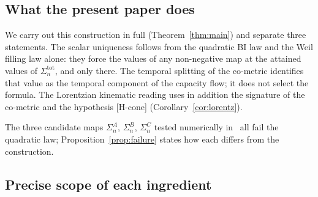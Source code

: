 \documentclass[11pt,a4paper]{article}
\begin{document}
    \subsection{What the present paper does}

      We carry out this construction in full (Theorem~\ref{thm:main}) and separate three statements.
      The scalar uniqueness follows from the quadratic BI law and the Weil filling law alone: they force the
      values of any non-negative map at the attained values of $\Sigma_n^{\mathrm{tot}}$, and only there.
      The temporal splitting of the co-metric identifies that value as the temporal component of the capacity
      flow; it does not select the formula.
      The Lorentzian kinematic reading uses in addition the signature of the co-metric and the hypothesis
      [H-cone] (Corollary~\ref{cor:lorentz}).

      The three candidate maps $\Sigma_n^A$, $\Sigma_n^B$, $\Sigma_n^C$ tested numerically in~\cite{Beau2026n}
      all fail the quadratic law; Proposition~\ref{prop:failure} states how each differs from the construction.

    \subsection{Precise scope of each ingredient}\label{sec:scope}
\end{document}
